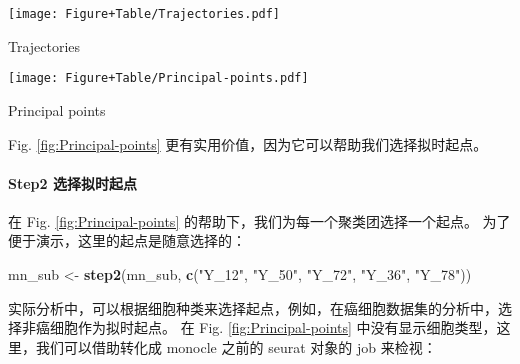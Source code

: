 \documentclass[
]{article}
\newenvironment{Shaded}{\begin{snugshade}}{\end{snugshade}}
\newcommand{\CommentTok}[1]{\textcolor[rgb]{0.56,0.35,0.01}{\textit{#1}}}
\newcommand{\KeywordTok}[1]{\textcolor[rgb]{0.13,0.29,0.53}{\textbf{#1}}}
\newcommand{\NormalTok}[1]{#1}
\newcommand{\OperatorTok}[1]{\textcolor[rgb]{0.81,0.36,0.00}{\textbf{#1}}}
\newcommand{\StringTok}[1]{\textcolor[rgb]{0.31,0.60,0.02}{#1}}
\begin{document}
\def\@captype{figure}
\begin{center}
\texttt{[image: Figure+Table/Trajectories.pdf]}
\caption{Trajectories}\label{fig:Trajectories}
\end{center}

\def\@captype{figure}
\begin{center}
\texttt{[image: Figure+Table/Principal-points.pdf]}
\caption{Principal points}\label{fig:Principal-points}
\end{center}

Fig. \ref{fig:Principal-points} 更有实用价值，因为它可以帮助我们选择拟时起点。

\hypertarget{step2-ux9009ux62e9ux62dfux65f6ux8d77ux70b9}{%
\paragraph{Step2 选择拟时起点}\label{step2-ux9009ux62e9ux62dfux65f6ux8d77ux70b9}}

在 Fig. \ref{fig:Principal-points} 的帮助下，我们为每一个聚类团选择一个起点。
为了便于演示，这里的起点是随意选择的：

\begin{Shaded}
\begin{Highlighting}[]
\NormalTok{mn\_sub \textless{}{-}}\StringTok{ }\KeywordTok{step2}\NormalTok{(mn\_sub, }\KeywordTok{c}\NormalTok{(}\StringTok{"Y\_12"}\NormalTok{, }\StringTok{"Y\_50"}\NormalTok{, }\StringTok{"Y\_72"}\NormalTok{, }\StringTok{"Y\_36"}\NormalTok{, }\StringTok{"Y\_78"}\NormalTok{))}
\end{Highlighting}
\end{Shaded}

实际分析中，可以根据细胞种类来选择起点，例如，在癌细胞数据集的分析中，选择非癌细胞作为拟时起点。
在 Fig. \ref{fig:Principal-points} 中没有显示细胞类型，这里，我们可以借助转化成 monocle 之前的
seurat 对象的 job 来检视：

\begin{Shaded}
\end{Shaded}
\end{document}
